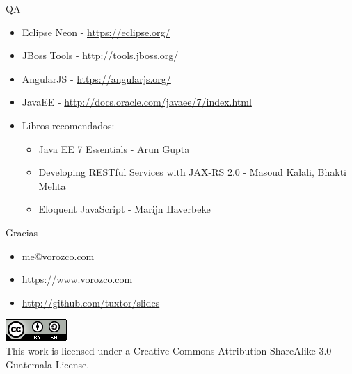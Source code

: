 \documentclass{beamer}
\begin{document}
\begin{frame}{QA}
	\begin{itemize}
		\item Eclipse Neon - \url{https://eclipse.org/}
		\item JBoss Tools - \url{http://tools.jboss.org/}
		\item AngularJS - \url{https://angularjs.org/}
		\item JavaEE - \url{http://docs.oracle.com/javaee/7/index.html}
		\item Libros recomendados:
		\begin{itemize}
			\item Java EE 7 Essentials - Arun Gupta
			\item Developing RESTful Services with JAX-RS 2.0 - Masoud Kalali, Bhakti Mehta
			\item Eloquent JavaScript - Marijn Haverbeke
		\end{itemize}
	\end{itemize}
\end{frame}

\begin{frame}{Gracias}
\begin{itemize}
\item me@vorozco.com
\item \url{https://www.vorozco.com}
\item \url{http://github.com/tuxtor/slides}
\end{itemize}
\begin{center}
\includegraphics[width=0.1\linewidth]{Images/cclogo}
\\
This work is licensed under a Creative Commons Attribution-ShareAlike 3.0 Guatemala License.
\end{center}
\end{frame}
\end{document}
